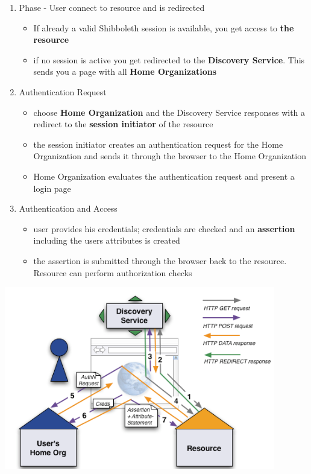 \documentclass[11pt,twoside,landscape]{article}
\begin{document}
\begin{multicols}{4}
\begin{enumerate}
\item Phase - User connect to resource and is redirected
\begin{itemize}
\item If already a valid Shibboleth session is available, you get access to \textbf{the resource}
\item if no session is active you get redirected to the \textbf{Discovery Service}. This sends you a page with all \textbf{Home Organizations}
\end{itemize}

\item Authentication Request
\begin{itemize}
\item choose \textbf{Home Organization} and the Discovery Service responses with a redirect to the \textbf{session initiator} of the resource
\item the session initiator creates an authentication request for the Home Organization and sends it through the browser to the Home Organization
\item Home Organization evaluates the authentication request and present a login page
\end{itemize}

\item Authentication and Access
\begin{itemize}
\item user provides his credentials; credentials are checked and an \textbf{assertion} including the users attributes is created
\item the assertion is submitted through the browser back to the resource. Resource can perform authorization checks
\end{itemize}
\end{enumerate}


\begin{center}
\includegraphics[width=.9\linewidth]{img/shibboleth.png}
\end{center}


\end{multicols}
\end{document}
